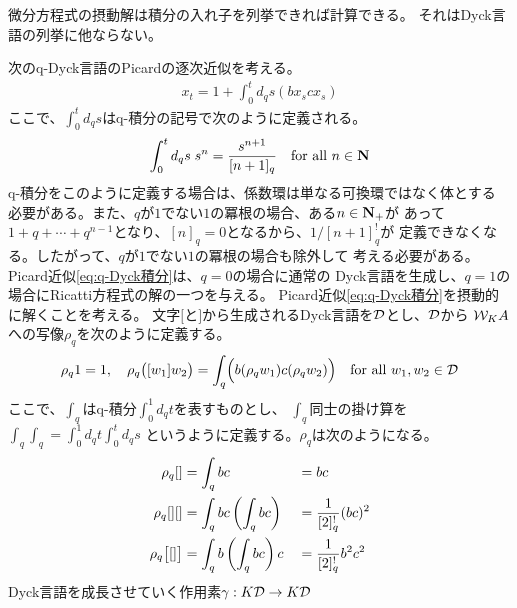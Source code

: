 {	\begin{todo}[方針]\label{todo:方針} %
		微分方程式の摂動解は積分の入れ子を列挙できれば計算できる。
		それはDyck言語の列挙に他ならない。
	\end{todo} %
\begin{todo}[ここまで]\label{todo:ここまで} %
\end{todo} %
	次のq-Dyck言語のPicardの逐次近似を考える。
	\begin{equation}\label{eq:q-Dyck積分}\begin{split}
		x_t = 1 + \int_0^t d_qs(bx_scx_s)
	\end{split}\end{equation}
	ここで、$\int_0^t d_qs$はq-積分の記号で次のように定義される。
	\begin{equation*}\begin{split}
		\int_0^t d_qs\; s^n = \frac{s^{n+1}}{[n+1]_q}
		\quad\text{for all } n\in\mathbf{N}
	\end{split}\end{equation*}
	q-積分をこのように定義する場合は、係数環は単なる可換環ではなく体とする
	必要がある。また、$q$が$1$でない$1$の冪根の場合、ある$n\in\mathbf{N}_+$が
	あって$1+q+\cdots+q^{n-1}$となり、$[n]_q=0$となるから、$1/[n+1]_q^!$が
	定義できなくなる。したがって、$q$が$1$でない$1$の冪根の場合も除外して
	考える必要がある。Picard近似\eqref{eq:q-Dyck積分}は、$q=0$の場合に通常の
	Dyck言語を生成し、$q=1$の場合にRicatti方程式の解の一つを与える。
	Picard近似\eqref{eq:q-Dyck積分}を摂動的に解くことを考える。
	文字$[$と$]$から生成されるDyck言語を${{\mathcal{D}}}$とし、${{\mathcal{D}}}$から
	${{\mathcal{W}}}_KA$への写像$\rho_q$を次のように定義する。
	\begin{equation*}\begin{split}
		\rho_q1 = 1,\quad
		\rho_q\bigl({[w_1]w_2}\bigr) = \int_q\Bigl({b(\rho_qw_1)c(\rho_qw_2)}\Bigr)
		\quad\text{for all } w_1,w_2\in{\ensuremath{{\mathcal{D}}}}
	\end{split}\end{equation*}
	ここで、$\int_q$はq-積分$\int_0^1 d_qt$を表すものとし、
	$\int_q$同士の掛け算を$\int_q\int_q=\int_0^1d_qt\int_0^td_qs$
	というように定義する。$\rho_q$は次のようになる。
	\begin{alignat*}{2}
		\rho_q[] &= \int_q bc &&= bc \\
		\rho_q[][] &= \int_qbc\left({\int_qbc}\right) &&= \frac{1}{[2]_q^!}(bc)^2 \\
		\rho_q\bigl[{[]}\bigr] &= \int_q b\left({\int_q bc}\right)c &&= \frac{1}{[2]_q^!}b^2c^2
	\end{alignat*}
	Dyck言語を成長させていく作用素$\gamma:K{{\mathcal{D}}}\to K{{\mathcal{D}}}$
}
